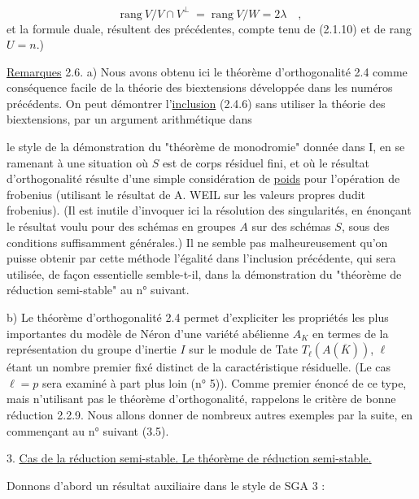 \begin{equation}\tag{2.5.5}
\mathrm{rang}\ V/V \cap V^{\perp} \;=\; \mathrm{rang}\ V/W = 2\lambda \quad ,
\end{equation}
et la formule duale, résultent des précédentes, compte tenu de (2.1.10) et de rang $U = n$.)

\underline{Remarques} 2.6.  a) Nous avons obtenu ici le théorème d'orthogonalité 2.4 comme conséquence facile de la théorie des biextensions développée dans les numéros précédents. On peut démontrer l'\underline{inclusion} (2.4.6) sans utiliser la théorie des biextensions, par un argument arithmétique dans



le style de la démonstration du "théorème de monodromie" donnée dans I, en se ramenant à une situation où $S$ est de corps résiduel fini, et où le résultat d'orthogonalité résulte d'une simple considération de \underline{poids} pour l'opération de frobenius (utilisant le résultat de A. WEIL sur les valeurs propres dudit frobenius). (Il est inutile d'invoquer ici la résolution des singularités, en énonçant le résultat voulu pour des schémas en groupes $A$ sur des schémas $S$, sous des conditions suffisamment générales.) Il ne semble pas malheureusement qu'on puisse obtenir par cette méthode l'égalité dans l'inclusion précédente, qui sera utilisée, de façon essentielle semble-t-il, dans la démonstration du "théorème de réduction semi-stable" au n° suivant.

b) Le théorème d'orthogonalité 2.4 permet d'expliciter les propriétés les plus importantes du modèle de Néron d'une variété abélienne $A_{K}$ en termes de la représentation du groupe d'inertie $I$ sur le module de Tate $T_{\ell}(A(\overline{K}))$, $\ell$ étant un nombre premier fixé distinct de la caractéristique résiduelle. (Le cas $\ell = p$ sera examiné à part plus loin (n° 5)). Comme premier énoncé de ce type, mais n'utilisant pas le théorème d'orthogonalité, rappelons le critère de bonne réduction 2.2.9. Nous allons donner de nombreux autres exemples par la suite, en commençant au n° suivant (3.5).




3. \underline{Cas de la réduction semi-stable. Le théorème de réduction semi-stable.}

Donnons d'abord un résultat auxiliaire dans le style de SGA 3 :

